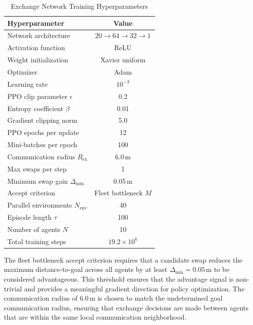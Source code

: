 \begin{table}[htbp]
    \centering
    \caption{Exchange Network Training Hyperparameters}
    \label{tab:exchange_config}
    \begin{tabular}{lc}
        \toprule
        \textbf{Hyperparameter} & \textbf{Value} \\
        \midrule
        Network architecture & $20 \rightarrow 64 \rightarrow 32 \rightarrow 1$ \\
        Activation function & ReLU \\
        Weight initialization & Xavier uniform \\
        Optimizer & Adam \\
        Learning rate & $10^{-3}$ \\
        PPO clip parameter $\epsilon$ & 0.2 \\
        Entropy coefficient $\beta$ & 0.01 \\
        Gradient clipping norm & 5.0 \\
        PPO epochs per update & 12 \\
        Mini-batches per epoch & 100 \\
        Communication radius $R_{\text{ex}}$ & 6.0\,m \\
        Max swaps per step & 1 \\
        Minimum swap gain $\Delta_{\min}$ & 0.05\,m \\
        Accept criterion & Fleet bottleneck $M$ \\
        Parallel environments $N_{\text{env}}$ & 40 \\
        Episode length $\tau$ & 100 \\
        Number of agents $N$ & 10 \\
        Total training steps & $19.2 \times 10^6$ \\
        \bottomrule
    \end{tabular}
\end{table}

The fleet bottleneck accept criterion requires that a candidate swap reduces the maximum distance-to-goal across all agents by at least $\Delta_{\min} = 0.05$\,m to be considered advantageous. This threshold ensures that the advantage signal is non-trivial and provides a meaningful gradient direction for policy optimization. The communication radius of 6.0\,m is chosen to match the undetermined goal communication radius, ensuring that exchange decisions are made between agents that are within the same local communication neighborhood.

